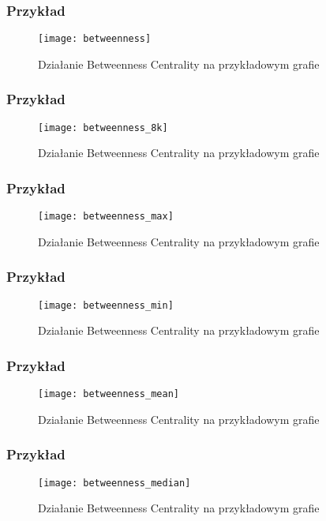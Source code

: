 \subsubsection{Przykład}
\begin{figure}[h]
	\centering
	\texttt{[image: betweenness]}
	\caption{Działanie Betweenness Centrality  na przykładowym grafie}
\end{figure}
\FloatBarrier
\subsubsection{Przykład}
\begin{figure}[h]
	\centering
	\texttt{[image: betweenness\_8k]}
	\caption{Działanie Betweenness Centrality  na przykładowym grafie}
\end{figure}
\FloatBarrier
\subsubsection{Przykład}
\begin{figure}[h]
	\centering
	\texttt{[image: betweenness\_max]}
	\caption{Działanie Betweenness Centrality  na przykładowym grafie}
\end{figure}
\FloatBarrier\FloatBarrier
\subsubsection{Przykład}
\begin{figure}[h]
	\centering
	\texttt{[image: betweenness\_min]}
	\caption{Działanie Betweenness Centrality  na przykładowym grafie}
\end{figure}
\FloatBarrier\FloatBarrier
\subsubsection{Przykład}
\begin{figure}[h]
	\centering
	\texttt{[image: betweenness\_mean]}
	\caption{Działanie Betweenness Centrality  na przykładowym grafie}
\end{figure}
\FloatBarrier\FloatBarrier
\subsubsection{Przykład}
\begin{figure}[h]
	\centering
	\texttt{[image: betweenness\_median]}
	\caption{Działanie Betweenness Centrality  na przykładowym grafie}
\end{figure}
\FloatBarrier